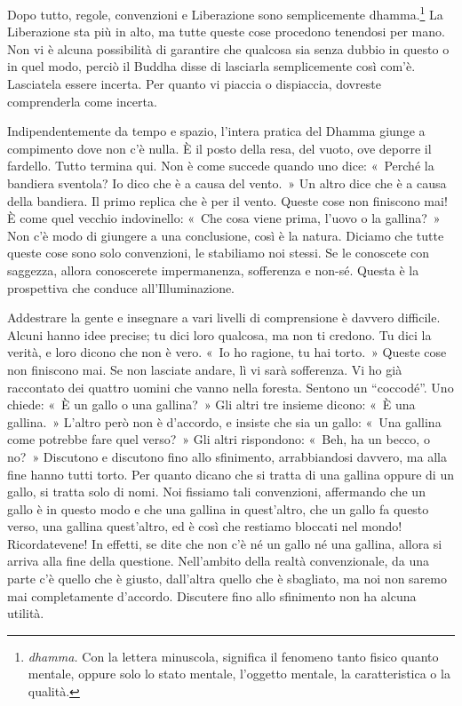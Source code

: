 Dopo tutto, regole, convenzioni e Liberazione sono semplicemente
dhamma.\footnote{\emph{dhamma.} Con la lettera minuscola,
  significa il fenomeno tanto fisico quanto mentale, oppure solo lo
  stato mentale, l'oggetto mentale, la caratteristica o la qualità.}
La Liberazione sta più in alto, ma tutte queste cose procedono tenendosi
per mano. Non vi è alcuna possibilità di garantire che qualcosa sia
senza dubbio in questo o in quel modo, perciò il Buddha disse di
lasciarla semplicemente così com'è. Lasciatela essere incerta. Per
quanto vi piaccia o dispiaccia, dovreste comprenderla come incerta.

Indipendentemente da tempo e spazio, l'intera pratica del Dhamma giunge
a compimento dove non c'è nulla. È il posto della resa, del vuoto, ove
deporre il fardello. Tutto termina qui. Non è come succede quando uno
dice: «~Perché la bandiera sventola? Io dico che è a causa del vento.~»
Un altro dice che è a causa della bandiera. Il primo replica che è per
il vento. Queste cose non finiscono mai! È come quel vecchio
indovinello: «~Che cosa viene prima, l'uovo o la gallina?~» Non c'è modo
di giungere a una conclusione, così è la natura. Diciamo che tutte
queste cose sono solo convenzioni, le stabiliamo noi stessi. Se le
conoscete con saggezza, allora conoscerete impermanenza, sofferenza e
non-sé. Questa è la prospettiva che conduce all'Illuminazione.

Addestrare la gente e insegnare a vari livelli di comprensione è davvero
difficile. Alcuni hanno idee precise; tu dici loro qualcosa, ma non ti
credono. Tu dici la verità, e loro dicono che non è vero. «~Io ho
ragione, tu hai torto.~» Queste cose non finiscono mai. Se non lasciate
andare, lì vi sarà sofferenza. Vi ho già raccontato dei quattro uomini
che vanno nella foresta. Sentono un ``coccodé''. Uno chiede: «~È un
gallo o una gallina?~» Gli altri tre insieme dicono: «~È una gallina.~»
L'altro però non è d'accordo, e insiste che sia un gallo: «~Una gallina
come potrebbe fare quel verso?~» Gli altri rispondono: «~Beh, ha un
becco, o no?~» Discutono e discutono fino allo sfinimento, arrabbiandosi
davvero, ma alla fine hanno tutti torto. Per quanto dicano che si tratta
di una gallina oppure di un gallo, si tratta solo di nomi. Noi fissiamo
tali convenzioni, affermando che un gallo è in questo modo e che una
gallina in quest'altro, che un gallo fa questo verso, una gallina
quest'altro, ed è così che restiamo bloccati nel mondo! Ricordatevene!
In effetti, se dite che non c'è né un gallo né una gallina, allora si
arriva alla fine della questione. Nell'ambito della realtà
convenzionale, da una parte c'è quello che è giusto, dall'altra quello
che è sbagliato, ma noi non saremo mai completamente d'accordo.
Discutere fino allo sfinimento non ha alcuna utilità.


